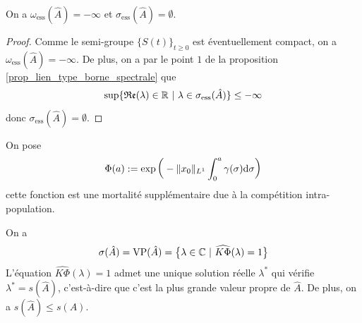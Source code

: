 \begin{corollaire}
    On a $\omega_{\text{ess}}(\hat{A}) = -\infty$ et $\sigma_{\text{ess}}(\hat{A}) = \emptyset$.
\end{corollaire}

\begin{proof}
    Comme le semi-groupe $\big\{S(t)\big\}_{t \geq 0}$ est éventuellement compact, on a $\omega_{\text{ess}}(\hat{A}) = -\infty$. De plus, on a par le point $1$ de la proposition \ref{prop_lien_type_borne_spectrale} que 
    \begin{equation*}
        \sup\{\Re(\lambda) \in \bbR \ | \ \lambda \in \sigma_{\text{ess}}(\hat{A})\} \leq -\infty
    \end{equation*}
    donc $\sigma_{\text{ess}}(\hat{A})=\emptyset$.
\end{proof}

On pose 
\begin{equation*}
    \Phi(a) := \exp\bigg(-\|x_0\|_{L^1}\int_0^a\gamma(\sigma)\mathrm{d} \sigma\bigg)
\end{equation*}
cette fonction est une mortalité supplémentaire due à la compétition intra-population.

\begin{theorem}\label{thm_spectre_A_chapeau}
    On a 
    \begin{equation*}
        \sigma(\hat{A}) = \mathrm{VP}(\hat{A}) = \big\{\lambda \in \mathbb{C} \ | \ \widehat{K\Phi}(\lambda)=1\big\}
    \end{equation*}
    L'équation $\widehat{K\Phi}(\lambda)=1$ admet une unique solution réelle $\lambda^*$ qui vérifie $\lambda^*=s(\hat{A})$, c'est-à-dire que c'est la plus grande valeur propre de $\hat{A}$. De plus, on a $s(\hat{A}) \leq s(A)$.
\end{theorem}

